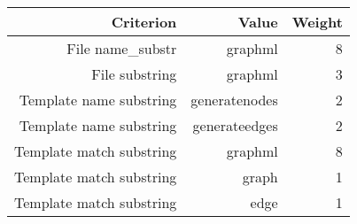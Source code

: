 \begin{tabular}{|r|r|r|}
\hline
\bf Criterion&\bf Value&\bf Weight\\
\hline
File name_substr&graphml&8\\
\hline
File substring&graphml&3\\
\hline
Template name substring&generatenodes&2\\
\hline
Template name substring&generateedges&2\\
\hline
Template match substring&graphml&8\\
\hline
Template match substring&graph&1\\
\hline
Template match substring&edge&1\\
\hline
\end{tabular}
